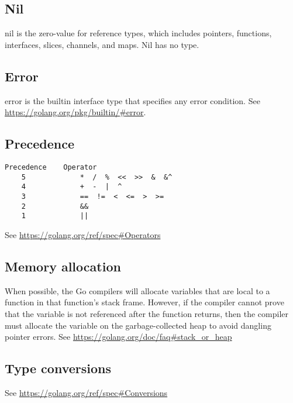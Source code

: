 \documentclass{article}
\begin{document}
	\subsection{Nil}
	\colorbox{code}{nil} is the zero-value for reference types, which includes pointers, functions, interfaces, slices, channels, and maps. Nil has no type. 
		
	\subsection{Error}
	\colorbox{code}{error} is the builtin interface type that specifies any error condition. See \url{https://golang.org/pkg/builtin/#error}.
		
	\subsection{Precedence}
	\begin{verbatim}
Precedence    Operator
    5             *  /  %  <<  >>  &  &^
    4             +  -  |  ^
    3             ==  !=  <  <=  >  >=
    2             &&
    1             ||
	\end{verbatim}
	See \url{https://golang.org/ref/spec#Operators}
	\subsection{Memory allocation}
		When possible, the Go compilers will allocate variables that are local to a function in that function's stack frame. However, if the compiler cannot prove that the variable is not referenced after the function returns, then the compiler must allocate the variable on the garbage-collected heap to avoid dangling pointer errors. See \url{https://golang.org/doc/faq#stack_or_heap}
		
	\subsection{Type conversions}
		See \url{https://golang.org/ref/spec#Conversions}
\end{document}

